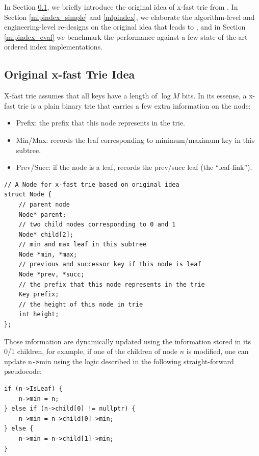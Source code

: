 \documentclass[11pt, usletter]{article}
\begin{document}
In Section \ref{intro_xfast}, we briefly introduce the original idea of x-fast trie from \cite{xfast}. 
In Section \ref{mlpindex_simple} and \ref{mlpindex}, 
we elaborate the algorithm-level and engineering-level re-designs on the original idea that leads to \MlpIndex, 
and in Section \ref{mlpindex_eval} we benchmark the performance against a few state-of-the-art ordered index implementations. 

\subsection{Original x-fast Trie Idea} \label{intro_xfast}

X-fast trie assumes that all keys have a length of $\log M$ bits.
In its essense, a x-fast trie is a plain binary trie that carries a few extra information on the node:
\begin{itemize}
[topsep=0pt,partopsep=0pt,itemsep=0pt,parsep=0pt,fullwidth,itemindent=\parindent,listparindent=\parindent]
\item Prefix: the prefix that this node represents in the trie.
\item Min/Max: records the leaf corresponding to minimum/maximum key in this subtree.
\item Prev/Succ: if the node is a leaf, records the prev/succ leaf (the ``leaf-link'').
\end{itemize}

\singlespacing\begin{codebox}
\begin{verbatim}
// A Node for x-fast trie based on original idea
struct Node {
    // parent node
    Node* parent;
    // two child nodes corresponding to 0 and 1
    Node* child[2];
    // min and max leaf in this subtree
    Node *min, *max;
    // previous and successor key if this node is leaf
    Node *prev, *succ;
    // the prefix that this node represents in the trie
    Key prefix;
    // the height of this node in trie
    int height;
};
\end{verbatim}
\end{codebox}\doublespacing

Those information are dynamically updated using the information stored in its 0/1 children, 
for example, if one of the children of node $n$ is modified, one can update n\verb|->|min
using the logic described in the following straight-forward pseudocode:

\singlespacing\begin{codebox}
\begin{verbatim}
if (n->IsLeaf) {
    n->min = n;
} else if (n->child[0] != nullptr) {
    n->min = n->child[0]->min;
} else {
    n->min = n->child[1]->min;
}
\end{verbatim}
\end{codebox}\doublespacing
\end{document}
